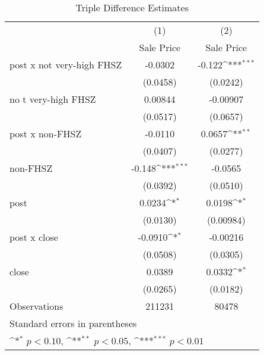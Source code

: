 \begin{table}[htbp]\centering
\def\sym#1{\ifmmode^{#1}\else\(^{#1}\)\fi}
\caption{Triple Difference Estimates\label{tabl}}
\begin{tabular}{l*{2}{c}}
\hline\hline
                    &\multicolumn{1}{c}{(1)}&\multicolumn{1}{c}{(2)}\\
                    &\multicolumn{1}{c}{Sale Price}&\multicolumn{1}{c}{Sale Price}\\
\hline
post x not very-high FHSZ&     -0.0302         &      -0.122\sym{***}\\
                    &    (0.0458)         &    (0.0242)         \\
[1em]
no t very-high FHSZ &     0.00844         &    -0.00907         \\
                    &    (0.0517)         &    (0.0657)         \\
[1em]
post x non-FHSZ     &     -0.0110         &      0.0657\sym{**} \\
                    &    (0.0407)         &    (0.0277)         \\
[1em]
non-FHSZ            &      -0.148\sym{***}&     -0.0565         \\
                    &    (0.0392)         &    (0.0510)         \\
[1em]
post                &      0.0234\sym{*}  &      0.0198\sym{*}  \\
                    &    (0.0130)         &   (0.00984)         \\
[1em]
post x close        &     -0.0910\sym{*}  &    -0.00216         \\
                    &    (0.0508)         &    (0.0305)         \\
[1em]
close               &      0.0389         &      0.0332\sym{*}  \\
                    &    (0.0265)         &    (0.0182)         \\
\hline
Observations        &      211231         &       80478         \\
\hline\hline
\multicolumn{3}{l}{\footnotesize Standard errors in parentheses}\\
\multicolumn{3}{l}{\footnotesize \sym{*} \(p<0.10\), \sym{**} \(p<0.05\), \sym{***} \(p<0.01\)}\\
\end{tabular}
\end{table}
